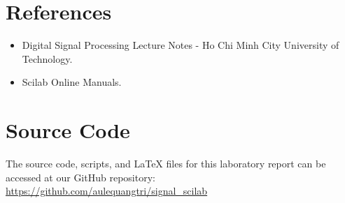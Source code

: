 \documentclass[12pt,a4paper]{article}
\begin{document}
\section{References}
\begin{itemize}
    \item Digital Signal Processing Lecture Notes - Ho Chi Minh City University of Technology.
    \item Scilab Online Manuals.
\end{itemize}

\section{Source Code}
The source code, scripts, and LaTeX files for this laboratory report can be accessed at our GitHub repository: \\
\url{https://github.com/aulequangtri/signal_scilab}
\end{document}
